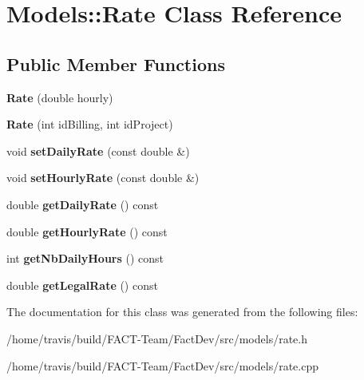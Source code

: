 \hypertarget{classModels_1_1Rate}{\section{Models\-:\-:Rate Class Reference}
\label{classModels_1_1Rate}
}
\subsection*{Public Member Functions}
\begin{DoxyCompactItemize}
\item 
\hypertarget{classModels_1_1Rate_ad2d770be11eb899e8bcf673ed462836e}{{\bfseries Rate} (double hourly)}\label{classModels_1_1Rate_ad2d770be11eb899e8bcf673ed462836e}

\item 
\hypertarget{classModels_1_1Rate_ab867d2b5b114df71814c742c957badd8}{{\bfseries Rate} (int id\-Billing, int id\-Project)}\label{classModels_1_1Rate_ab867d2b5b114df71814c742c957badd8}

\item 
\hypertarget{classModels_1_1Rate_a2f07614aa1d1a4957fd8d4de4d3680d5}{void {\bfseries set\-Daily\-Rate} (const double \&)}\label{classModels_1_1Rate_a2f07614aa1d1a4957fd8d4de4d3680d5}

\item 
\hypertarget{classModels_1_1Rate_a75a770086f7ef9e702b961a32fc735b5}{void {\bfseries set\-Hourly\-Rate} (const double \&)}\label{classModels_1_1Rate_a75a770086f7ef9e702b961a32fc735b5}

\item 
\hypertarget{classModels_1_1Rate_a937b0efecbc5b3561ad08fe712165d0b}{double {\bfseries get\-Daily\-Rate} () const }\label{classModels_1_1Rate_a937b0efecbc5b3561ad08fe712165d0b}

\item 
\hypertarget{classModels_1_1Rate_ac4c3d9c09bed20d639997da7d6c6798b}{double {\bfseries get\-Hourly\-Rate} () const }\label{classModels_1_1Rate_ac4c3d9c09bed20d639997da7d6c6798b}

\item 
\hypertarget{classModels_1_1Rate_a08add6d8b4db1b9a37a3f9cc22d0d0df}{int {\bfseries get\-Nb\-Daily\-Hours} () const }\label{classModels_1_1Rate_a08add6d8b4db1b9a37a3f9cc22d0d0df}

\item 
\hypertarget{classModels_1_1Rate_aa06f56d236743c66b2e6b1bc772b9233}{double {\bfseries get\-Legal\-Rate} () const }\label{classModels_1_1Rate_aa06f56d236743c66b2e6b1bc772b9233}

\end{DoxyCompactItemize}


The documentation for this class was generated from the following files\-:\begin{DoxyCompactItemize}
\item 
/home/travis/build/\-F\-A\-C\-T-\/\-Team/\-Fact\-Dev/src/models/rate.\-h\item 
/home/travis/build/\-F\-A\-C\-T-\/\-Team/\-Fact\-Dev/src/models/rate.\-cpp\end{DoxyCompactItemize}
